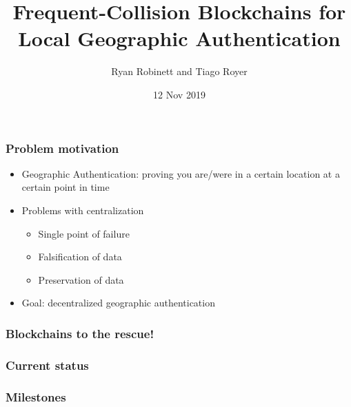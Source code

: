 \documentclass{beamer}
\begin{document}
\title{Frequent-Collision Blockchains for Local Geographic Authentication}
\author{Ryan Robinett and Tiago Royer}
\date{12 Nov 2019}

\begin{frame}
    \titlepage
\end{frame}

\begin{frame}
	\frametitle{Problem motivation}

	\begin{itemize}
		\item Geographic Authentication:
			proving you are/were in a certain location
			at a certain point in time
		\item Problems with centralization
			\begin{itemize}
				\item Single point of failure
				\item Falsification of data
				\item Preservation of data
			\end{itemize}
		\item Goal: decentralized geographic authentication
	\end{itemize}
\end{frame}

\begin{frame}
	\frametitle{Blockchains to the rescue!}
\end{frame}

\begin{frame}
	\frametitle{Current status}
\end{frame}

\begin{frame}
	\frametitle{Milestones}
\end{frame}
\end{document}

